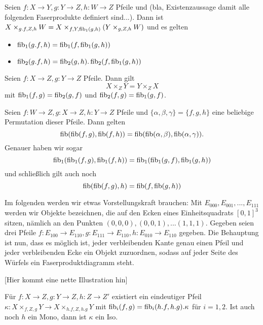 \begin{satz}[Staffelung]
Seien $f: X\to Y,g : Y\to Z,h:W\to Z$ Pfeile und (bla, Existenzaussage damit alle folgenden Faserprodukte definiert sind...). Dann ist $X\times_{g.f,Z,h} W = X\times_{f,Y,\operatorname{fib}_1(g,h)} (Y\times_{g,Z,h} W)$ und es gelten
\begin{itemize}
\item $\operatorname{fib}_1(g.f,h) = \operatorname{fib}_1(f,\operatorname{fib}_1(g,h))$
\item $\operatorname{fib}_2(g.f,h) = \operatorname{fib}_2(g,h) . \operatorname{fib}_2(f,\operatorname{fib}_1(g,h))$
\end{itemize}
\end{satz}

\begin{prop}[Kommutativität]
Seien $f : X\to Z, g:Y\to Z$ Pfeile. Dann gilt
\[ X\times_Z Y = Y\times_Z X \]
mit $\operatorname{fib}_1(f,g) = \operatorname{fib}_2(g,f)$ und $\operatorname{fib}_2(f,g) = \operatorname{fib}_1(g,f)$.
\end{prop}

\begin{prop}[Assoziativität]
Seien $f : W \to Z, g: X \to Z, h : Y\to Z$ Pfeile und $\{ \alpha, \beta, \gamma \} = \{ f,g,h\}$ eine beliebige Permutation dieser Pfeile. Dann gelten
\[ \operatorname{fib}(\operatorname{fib}(f,g),\operatorname{fib}(f,h)) = \operatorname{fib}(\operatorname{fib}(\alpha,\beta),\operatorname{fib}(\alpha,\gamma)). \]
Genauer haben wir sogar
\[ \operatorname{fib}_1(\operatorname{fib}_1(f,g),\operatorname{fib}_1(f,h)) = \operatorname{fib}_1(\operatorname{fib}_1(g,f),\operatorname{fib}_1(g,h)) \]
und schließlich gilt auch noch
\[ \operatorname{fib}(\operatorname{fib}(f,g),h) = \operatorname{fib}(f,\operatorname{fib}(g,h)) \]
\end{prop}

\begin{korr}[Faserproduktwürfel]
Im folgenden werden wir etwas Vorstellungskraft brauchen: Mit $E_{000},E_{001},...,E_{111}$ werden wir Objekte bezeichnen, die auf den Ecken eines Einheitsquadrats $[0,1]^3$ sitzen, nämlich an den Punkten $(0,0,0),(0,0,1),...(1,1,1)$.
Gegeben seien drei Pfeile $f : E_{100} \to E_{110}, g : E_{111} \to E_{110}, h : E_{010} \to E_{110}$ gegeben. Die Behauptung ist nun, dass es möglich ist, jeder verbleibenden Kante genau einen Pfeil und jeder verbleibenden Ecke ein Objekt zuzuordnen, sodass auf jeder Seite des Würfels ein Faserproduktdiagramm steht.

[Hier kommt eine nette Illustration hin]
\end{korr}

\begin{prop}
Für $f: X\to Z, g:Y\to Z, h:Z\to Z'$ existiert ein eindeutiger Pfeil $\kappa : X\times_{f,Z,g} Y \to X\times_{h.f,Z,h.g} Y$ mit $\operatorname{fib}_i(f,g) = \operatorname{fib}_i(h.f,h.g).\kappa$ für $i=1,2$. Ist auch noch $h$ ein Mono, dann ist $\kappa$ ein Iso.
\end{prop}

